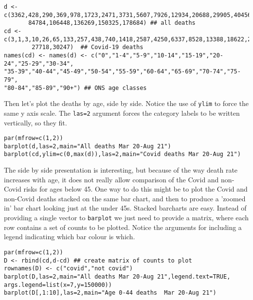 \documentclass[10pt] {article}
\newcommand{\eps}[3]
{{\begin{center}
 \rotatebox{#1}{\scalebox{#2}{\texttt{[image: \#3]}}}
 \end{center}}
}
\theoremstyle{definition}
\begin{document}
\begin{lstlisting}
d <- c(3362,428,290,369,978,1723,2471,3731,5607,7926,12934,20688,29905,40456,53579,
       84784,106448,136269,150325,178684) ## all deaths
cd <- c(3,1,3,10,26,65,133,257,438,740,1418,2587,4250,6337,8528,13388,18622,25220,
        27718,30247)  ## Covid-19 deaths
names(cd) <- names(d) <- c("0","1-4","5-9","10-14","15-19","20-24","25-29","30-34",
"35-39","40-44","45-49","50-54","55-59","60-64","65-69","70-74","75-79",
"80-84","85-89","90+") ## ONS age classes
\end{lstlisting}     
Then let's plot the deaths by age, side by side. Notice the use of \lstinline+ylim+ to force the same y axis scale. The \lstinline+las=2+ argument forces the category labels to be written vertically, so they fit. 
\begin{lstlisting}
par(mfrow=c(1,2))
barplot(d,las=2,main="All deaths Mar 20-Aug 21")
barplot(cd,ylim=c(0,max(d)),las=2,main="Covid deaths Mar 20-Aug 21")
\end{lstlisting} 
\eps{-90}{.5}{deaths1.eps}   
The side by side presentation is interesting, but because of the way death rate increases with age, it does not really allow comparison of the Covid and non-Covid risks for ages below 45. One way to do this might be to plot the Covid and non-Covid deaths stacked on the same bar chart, and then to produce a 'zoomed in' bar chart looking just at the under 45s. Stacked barcharts are easy. Instead of providing a single vector to \lstinline+barplot+ we just need to provide a matrix, where each row contains a set of counts to be plotted. Notice the arguments for including a legend indicating which bar colour is which.
\begin{lstlisting}
par(mfrow=c(1,2))
D <- rbind(cd,d-cd) ## create matrix of counts to plot
rownames(D) <- c("covid","not covid")
barplot(D,las=2,main="All deaths Mar 20-Aug 21",legend.text=TRUE,
args.legend=list(x=7,y=150000)) 
barplot(D[,1:10],las=2,main="Age 0-44 deaths  Mar 20-Aug 21")
\end{lstlisting}
\eps{-90}{.5}{deaths2.eps} 
\end{document}
